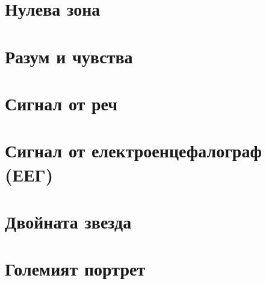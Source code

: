 \chapter*{Нулева зона}

\chapter{Разум и чувства}
\label{chap:emotion}

\chapter{Сигнал от реч}
\label{chap:speech}
    
    
    
    
    
    
\chapter{Сигнал от електроенцефалограф (ЕЕГ)}
\label{chap:eeg}
    
    
    
    
\chapter{Двойната звезда}
\label{chap:double}
    
\chapter*{Големият портрет}
\label{conclusion}
    
\begin{appendices}
    
    
    
    
    
\end{appendices}
\printbibliography[heading=bibintoc]
